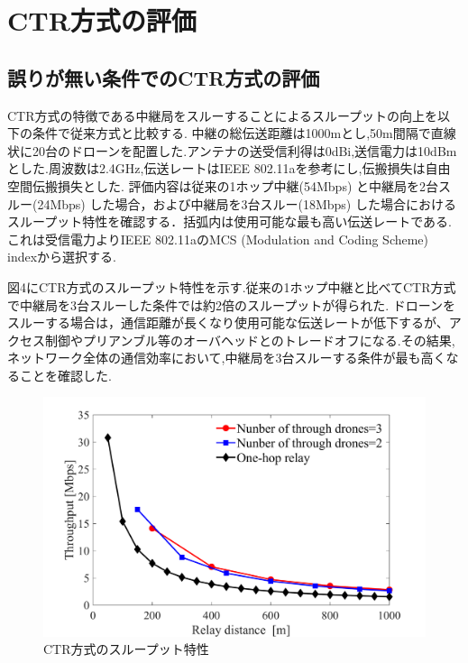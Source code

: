 \documentclass[a4paper,10.5pt]{ltjsarticle}  %
\begin{document}
\section{CTR方式の評価}
\subsection{誤りが無い条件でのCTR方式の評価}
CTR方式の特徴である中継局をスルーすることによるスループットの向上を以下の条件で従来方式と比較する.
中継の総伝送距離は1000mとし,50m間隔で直線状に20台のドローンを配置した.アンテナの送受信利得は0dBi,送信電力は10dBmとした.周波数は2.4GHz,伝送レートはIEEE 802.11aを参考にし,伝搬損失は自由空間伝搬損失とした.
評価内容は従来の1ホップ中継(54Mbps) と中継局を2台スルー(24Mbps) した場合，および中継局を3台スルー(18Mbps) した場合におけるスループット特性を確認する．括弧内は使用可能な最も高い伝送レートである.これは受信電力よりIEEE 802.11aのMCS (Modulation and Coding Scheme) indexから選択する.

図4にCTR方式のスループット特性を示す.従来の1ホップ中継と比べてCTR方式で中継局を3台スルーした条件では約2倍のスループットが得られた.
ドローンをスルーする場合は，通信距離が長くなり使用可能な伝送レートが低下するが、アクセス制御やプリアンブル等のオーバヘッドとのトレードオフになる.その結果,ネットワーク全体の通信効率において,中継局を3台スルーする条件が最も高くなることを確認した.

\begin{figure}[H]
  \centering
  \includegraphics[width=\linewidth]{throughtput_vs_placement_50m_max_distance_3.pdf} %
  \caption{CTR方式のスループット特性}
  \label{fig:throughput_through} %
\end{figure}
\end{document}
